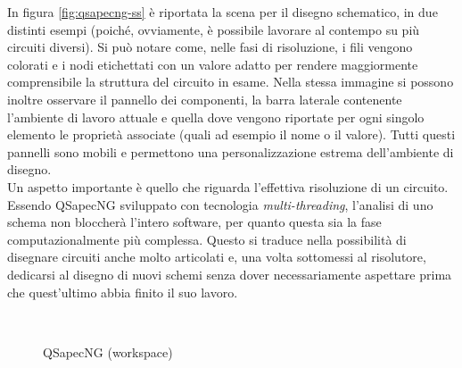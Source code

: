 In figura \ref{fig:qsapecng-ss} è riportata la scena per il disegno schematico, in due distinti esempi (poiché, ovviamente, è possibile lavorare al contempo su più circuiti diversi). Si può notare come, nelle fasi di risoluzione, i fili vengono colorati e i nodi etichettati con un valore adatto per rendere maggiormente comprensibile la struttura del circuito in esame. Nella stessa immagine si possono inoltre osservare il pannello dei componenti, la barra laterale contenente l'ambiente di lavoro attuale e quella dove vengono riportate per ogni singolo elemento le proprietà associate (quali ad esempio il nome o il valore). Tutti questi pannelli sono mobili e permettono una personalizzazione estrema dell'ambiente di disegno.\\
Un aspetto importante è quello che riguarda l'effettiva risoluzione di un circuito. Essendo QSapecNG sviluppato con tecnologia \textit{multi-threading}, l'analisi di uno schema non bloccherà l'intero software, per quanto questa sia la fase computazionalmente più complessa. Questo si traduce nella possibilità di disegnare circuiti anche molto articolati e, una volta sottomessi al risolutore, dedicarsi al disegno di nuovi schemi senza dover necessariamente aspettare prima che quest'ultimo abbia finito il suo lavoro.

\begin{figure}[hb]
 \centering
 \\
 \caption{QSapecNG (workspace)}
 \label{fig:qsapecng-ws}
\end{figure}

